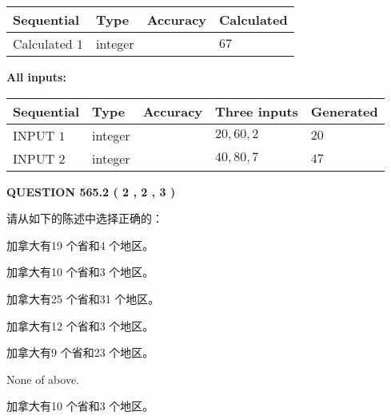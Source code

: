 \documentclass{ctexart}
\begin{document}
  
\noindent\begin{tabular}{|l|l|l|l|}
\hline
 Sequential & Type & Accuracy & Calculated \\ 
\hline
 
 
  Calculated $  1 $ & integer &  & 
  $ 67 $ 
 \\  \hline  
 \end{tabular}
   
   
   
   
\noindent\vspace{0.1in}\hspace{-0.08in} {\textbf{\Large{All inputs: }}}
   
   
  
  
\noindent\begin{tabular}{|l|l|l|l|l|}
\hline
 Sequential & Type & Accuracy & Three inputs & Generated \\ 
\hline
 
 
  INPUT $  1 $ & integer &  & $
 20
 , 
 60
 , 
 2
 $ & $ 20 $ 
 \\  \hline  
 
 
  INPUT $  2 $ & integer &  & $
 40
 , 
 80
 , 
 7
 $ & $ 47 $ 
 \\  \hline  
 \end{tabular}
   
   
  
\vspace{0.2in}
  
{\textbf{\Large{QUESTION
565.2 
 ( 2 , 2 , 3 )
}}}
  
  
请从如下的陈述中选择正确的：
 
 
加拿大有19 个省和4 个地区。
 
 
加拿大有10 个省和3 个地区。
 
 
加拿大有25 个省和31 个地区。
 
 
加拿大有12 个省和3 个地区。
 
 
加拿大有9 个省和23 个地区。
 
 
 None of above.
 
 
\noindent{}
 
 
加拿大有10 个省和3 个地区。
 
 
\noindent{}
 
\end{document}
